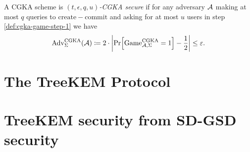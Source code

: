 \begin{definition}
	A CGKA scheme is \emph{$(t, \epsilon, q, u)$-CGKA secure} if for any adversary $\mathcal{A}$ making at most $q$ queries to $\mathrm{create-commit}$ and asking for at most $u$ users in step \ref{def:cgka-game-step-1} we have
	\begin{align*}
		\mathrm{Adv}_{\Sigma}^{\mathrm{CGKA}}(\adv) \coloneqq 2 \cdot \abs*{\pr{\mathrm{Game}_{\adv, \Sigma}^{\mathrm{CGKA}} = 1} - \frac{1}{2}} \le \epsilon.
	\end{align*}
\end{definition}

\section{The TreeKEM Protocol}



\section{TreeKEM security from SD-GSD security}


\begin{theorem}
\end{theorem}
